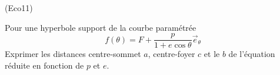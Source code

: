 \begin{tiny}(Eco11)\end{tiny} Pour une hyperbole support de la courbe paramétrée
\begin{displaymath}
 f(\theta) = F+\frac{p}{1+e\cos \theta} \overrightarrow e_\theta
\end{displaymath}
 Exprimer les distances centre-sommet $a$, centre-foyer $c$ et le $b$ de l'équation réduite en fonction de $p$ et $e$.